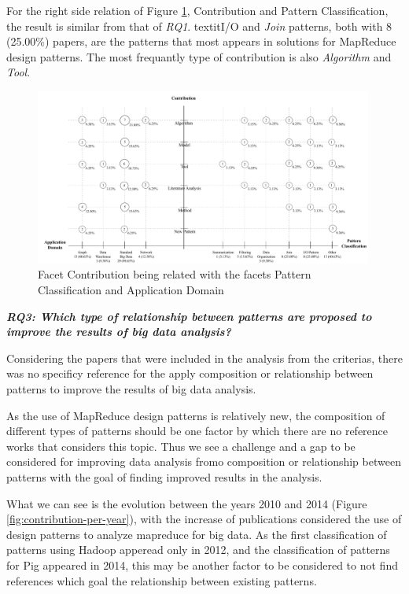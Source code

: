 For the right side relation of Figure \ref{fig:contribution-patterns-domain},
Contribution and Pattern Classification, the result is similar from that of
\textit{RQ1}. textit{I/O} and \textit{Join} patterns, both with 8 (25.00\%)
papers, are the patterns that most appears in solutions for MapReduce design
patterns. The most frequantly type of contribution is also \textit{Algorithm}
and \textit{Tool}.

\begin{figure}[hbtp]
\centering
\includegraphics[width=0.99\textwidth]{figs/Contribution-Patterns-Domain.pdf}
\caption{Facet Contribution being related with the facets Pattern
Classification and Application Domain}
\label{fig:contribution-patterns-domain}
\end{figure}

\bigskip
\textbf{\textit{RQ3: Which type of relationship between patterns are proposed to
improve the results of big data analysis?}}
 
Considering the papers that were included in the analysis from the criterias,
there was no specificy reference for the apply composition or relationship
between patterns to improve the results of big data analysis. 


As the use of MapReduce design patterns is relatively new, the
composition of different types of patterns should be one factor by which
there are no reference works that considers this topic.
Thus we see a challenge and a gap to be considered for improving data analysis
fromo composition or  relationship between patterns with the goal of finding
improved results in the analysis.
 
What we can see is the evolution between the years 2010 and 2014 (Figure
\ref{fig:contribution-per-year}), with the increase of publications considered the use of design patterns to analyze
mapreduce for big data. As the first classification of patterns using Hadoop
apperead only in 2012, and the classification of patterns for Pig appeared
in 2014, this may be another factor to be considered to not find references
which goal the relationship between existing patterns.
  

